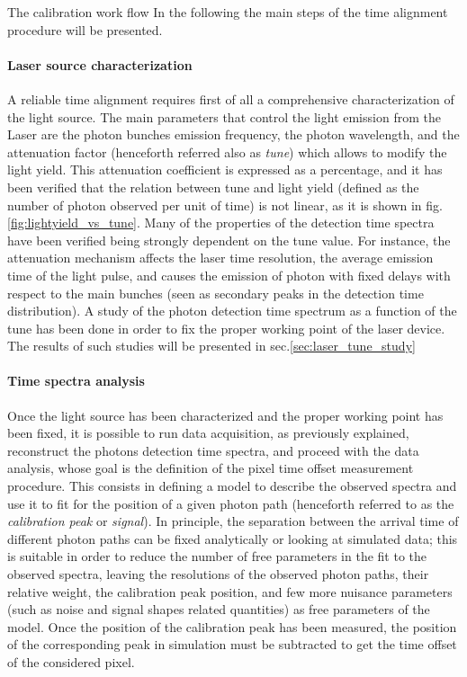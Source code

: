 \documentclass[a4paper,11pt]{article}
\begin{document}
\begin{subsection}{The calibration work flow}
In the following the main steps of the time alignment procedure will be presented.

\paragraph{Laser source characterization} A reliable time alignment requires first of all a comprehensive characterization of the light source. The main parameters that control the light emission from the Laser are the photon bunches emission frequency, the photon wavelength, and the attenuation factor (henceforth referred also as {\itshape tune}) which allows to modify the light yield. This attenuation coefficient is expressed as a percentage, and it has been verified that the relation between tune and light yield (defined as the number of photon observed per unit of time) is not linear, as it is shown in fig.\ref{fig:lightyield_vs_tune}. Many of the properties of the detection time spectra have been verified being strongly dependent on the tune value. For instance, the attenuation mechanism affects the laser time resolution, the average emission time of the light pulse, and causes the emission of photon with fixed delays with respect to the main bunches (seen as secondary peaks in the detection time distribution). A study of the photon detection time spectrum as a function of the tune has been done in order to fix the proper working point of the laser device. The results of such studies will be presented in sec.\ref{sec:laser_tune_study} 

\paragraph{Time spectra analysis} Once the light source has been characterized and the proper working point has been fixed, it is possible to run data acquisition, as previously explained, reconstruct the photons detection time spectra, and proceed with the data analysis, whose goal is the definition of the pixel time offset measurement procedure. This consists in defining a model to describe the observed spectra and use it to fit for the position of a given photon path (henceforth referred to as the {\itshape calibration peak} or {\itshape signal}). In principle, the separation between the arrival time of different photon paths can be fixed analytically or looking at simulated data; this is suitable in order to reduce the number of free parameters in the fit to the observed spectra, leaving the resolutions of the observed photon paths, their relative weight, the calibration peak position, and few more nuisance parameters (such as noise and signal shapes related quantities) as free parameters of the model. Once the position of the calibration peak has been measured, the position of the corresponding peak in simulation must be subtracted to get the time offset of the considered pixel. 


\end{subsection}
\end{document}
